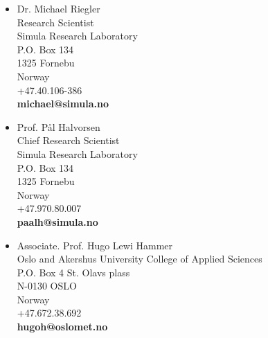 \documentclass[11pt,a4paper,scan]{moderncv}        %
\begin{document}
\begin{multicols}{2}
	\begin{itemize}
	
		
		\item Dr. Michael Riegler \\ Research Scientist \\ Simula Research Laboratory \\ P.O. Box 134 \\ 1325 Fornebu \\ Norway\\ +47.40.106-386 \\ \textbf{michael@simula.no} \\
		
		\item Prof. Pål Halvorsen \\ Chief Research Scientist \\ Simula Research Laboratory \\ P.O. Box 134 \\ 1325 Fornebu \\ Norway\\ +47.970.80.007 \\ \textbf{paalh@simula.no}
		\columnbreak
		\item Associate. Prof. Hugo Lewi Hammer \\Oslo and Akershus University College of Applied Sciences\\ P.O. Box 4 St. Olavs plass\\N-0130 OSLO \\ Norway\\ +47.672.38.692 \\ \textbf{hugoh@oslomet.no}\\
		

\end{itemize}
\end{multicols}
\end{document}
